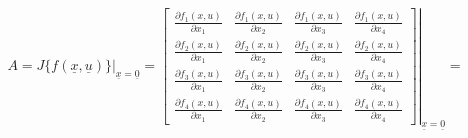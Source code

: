 \begin{equation} \label{jacobian}
    A=  \left. J\{f(\underline{x},\underline{u})\} \right|_{\underline{x}=\underline{0}} =
    \left. \begin{bmatrix}
    \frac{\partial f_1(x,u)}{\partial x_1} & \frac{\partial f_1(x,u)}{\partial x_2} & \frac{\partial f_1(x,u)}{\partial x_3} & \frac{\partial f_1(x,u)}{\partial x_4} \\
    \frac{\partial f_2(x,u)}{\partial x_1} & \frac{\partial f_2(x,u)}{\partial x_2} & \frac{\partial f_2(x,u)}{\partial x_3} & \frac{\partial f_2(x,u)}{\partial x_4} \\
    \frac{\partial f_3(x,u)}{\partial x_1} & \frac{\partial f_3(x,u)}{\partial x_2} & \frac{\partial f_3(x,u)}{\partial x_3} & \frac{\partial f_3(x,u)}{\partial x_4} \\
    \frac{\partial f_4(x,u)}{\partial x_1} & \frac{\partial f_4(x,u)}{\partial x_2} & \frac{\partial f_4(x,u)}{\partial x_3} & \frac{\partial f_4(x,u)}{\partial x_4}
    \end{bmatrix} \right|_{\underline{x}=\underline{0}}
    = 
\end{equation}
